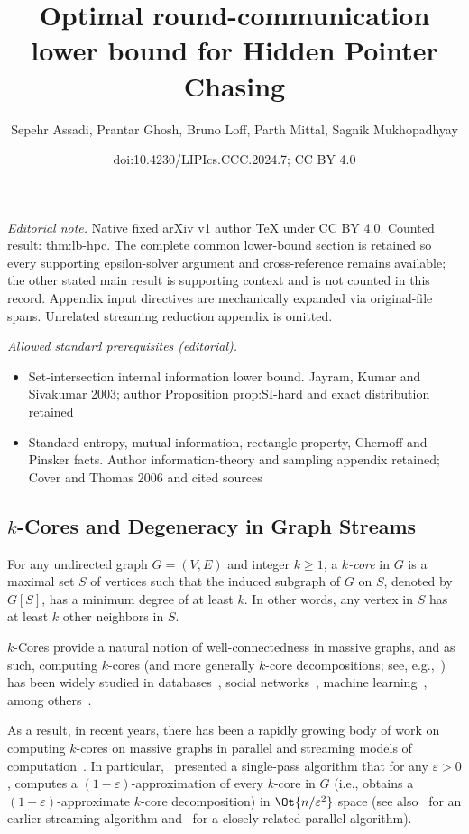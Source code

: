 \documentclass[11pt,letterpaper]{article}
\title{Optimal round-communication lower bound for Hidden Pointer Chasing}
\author{Sepehr Assadi, Prantar Ghosh, Bruno Loff, Parth Mittal, Sagnik Mukhopadhyay}
\date{doi:10.4230/LIPIcs.CCC.2024.7; CC BY 4.0}
\newcommand{\eps}{\varepsilon}
\renewcommand{\geq}{\geqslant}
\theoremstyle{definition}
\begin{document}
\maketitle
\setcounter{section}{2}
\noindent\textit{Editorial note.} Native fixed arXiv v1 author TeX under CC BY 4.0. Counted result: thm:lb-hpc. The complete common lower-bound section is retained so every supporting epsilon-solver argument and cross-reference remains available; the other stated main result is supporting context and is not counted in this record. Appendix input directives are mechanically expanded via original-file spans. Unrelated streaming reduction appendix is omitted.\par\medskip
\noindent\textit{Allowed standard prerequisites (editorial).}\begin{itemize}
\item Set-intersection internal information lower bound. Jayram, Kumar and Sivakumar 2003; author Proposition prop:SI-hard and exact distribution retained
\item Standard entropy, mutual information, rectangle property, Chernoff and Pinsker facts. Author information-theory and sampling appendix retained; Cover and Thomas 2006 and cited sources
\end{itemize}\medskip
\subsection{\texorpdfstring{$k$-Cores}{k-Cores} and Degeneracy in Graph Streams}\label{sec:degen-intro}

For any undirected graph $G=(V,E)$ and integer $k \geq 1$, a \emph{$k$-core} in $G$ is a maximal set $S$ of vertices such that the induced subgraph of $G$ on $S$, denoted by $G[S]$, has a minimum degree of at least $k$. In other words, 
any vertex in $S$ has at least $k$ other neighbors in $S$. 

$k$-Cores provide a natural notion of well-connectedness in massive graphs, and as such, computing $k$-cores (and more generally $k$-core decompositions; see, e.g.,~\cite{LiuSYDS22}) 
has been widely studied in databases~\cite{BonchiGKV14, ChuZ00ZXZ20, LiZZQZL19}, social networks~\cite{DhulipalaBS17, DhulipalaBS18, KhaouidBST15}, machine learning~\cite{Alvarez-HamelinDBV05, EsfandiariLM18, GhaffariLM19}, 
among others~\cite{LiWSX18,GalimbertiBGL20, SariyuceGJWC13}. 

As a result, in recent years, there has been a rapidly growing body of work on
computing $k$-cores on massive graphs in parallel and streaming
models of computation~\cite{SariyuceGJWC13,DhulipalaBS17, DhulipalaBS18,EsfandiariLM18, GhaffariLM19,LiuSYDS22}. In particular,~\cite{EsfandiariLM18} presented a single-pass algorithm that for any $\eps > 0$, 
computes a $(1-\eps)$-approximation of every $k$-core in $G$ (i.e., obtains a $(1-\eps)$-approximate $k$-core decomposition) in $\Ot{n/\eps^2}$ space (see also~\cite{SariyuceGJWC13} for an earlier streaming algorithm and~\cite{GhaffariLM19}
for a closely related parallel algorithm). 
\end{document}
